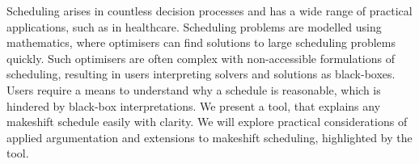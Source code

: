 Scheduling arises in countless decision processes and has a wide range of practical applications, such as in healthcare. Scheduling problems are modelled using mathematics, where optimisers can find solutions to large scheduling problems quickly. Such optimisers are often complex with non-accessible formulations of scheduling, resulting in users interpreting solvers and solutions as black-boxes. Users require a means to understand why a schedule is reasonable, which is hindered by black-box interpretations.
\linespace
We present a tool, \emph{\toolname} that explains any makeshift schedule easily with clarity. We will explore practical considerations of applied argumentation and extensions to makeshift scheduling, highlighted by the tool.